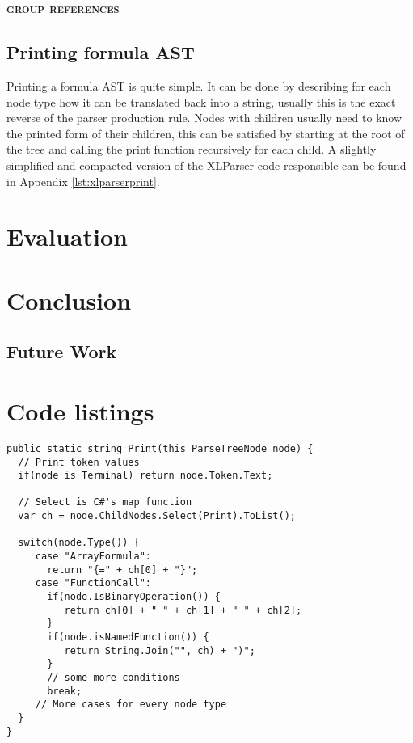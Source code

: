 \documentclass[12pt,a4paper,onecolumn,oneside,parskip]{memoir}
\newcommand{\rf}[1]{\textsc{\lowercase{#1}}}
\begin{document}
\subsection{\rf{Group References}}

\section{Printing formula AST}

\noindent
\begin{figure}[h!]
\hspace*{0.003\textwidth}

\end{figure}

Printing a formula AST is quite simple.
It can be done by describing for each node type how it can be translated back into a string, usually this is the exact reverse of the parser production rule.
Nodes with children usually need to know the printed form of their children, this can be satisfied by starting at the root of the tree and calling the print function recursively for each child.
A slightly simplified and compacted version of the XLParser code responsible can be found in Appendix \ref{lst:xlparserprint}.

\chapter{Evaluation}


\chapter{Conclusion}

\section{Future Work}

\appendix

\chapter{Code listings}

\lstset{style=sharpc}
\begin{lstlisting}[float,caption={XLParser Print method (simplified)}, label={lst:xlparserprint}]
public static string Print(this ParseTreeNode node) {
  // Print token values
  if(node is Terminal) return node.Token.Text;
  
  // Select is C#'s map function
  var ch = node.ChildNodes.Select(Print).ToList();
  
  switch(node.Type()) {
     case "ArrayFormula":
       return "{=" + ch[0] + "}";
     case "FunctionCall":
       if(node.IsBinaryOperation()) {
          return ch[0] + " " + ch[1] + " " + ch[2];
       }
       if(node.isNamedFunction()) {
          return String.Join("", ch) + ")";
       }
       // some more conditions
       break;
     // More cases for every node type
  }
}
\end{lstlisting}
\end{document}
